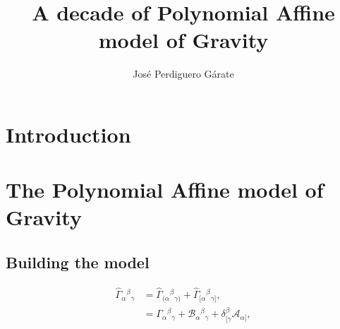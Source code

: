 \documentclass{article}
\title{A decade of Polynomial Affine model of Gravity}
\author{Jos\'e Perdiguero G\'arate}
\begin{document}
\maketitle
\tableofcontents

\section{Introduction}
\label{sec:introduction}


\section{The Polynomial Affine model of Gravity}
\label{sec:pag}


\subsection{Building the model}
\label{subsec:building the model}

\begin{equation}
\begin{aligned}
    \label{affine_connection}
    \hat{\Gamma}_{\alpha}{}^{\beta}{}_{\gamma} & = \hat{\Gamma}_{(\alpha}{}^{\beta}{}_{\gamma)} +  \hat{\Gamma}_{[\alpha}{}^{\beta}{}_{\gamma]},  \\
    & = \Gamma_{\alpha}{}^{\beta}{}_{\gamma} + \mathcal{B}_{\alpha}{}^{\beta}{}_{\gamma} + \delta^{\beta}_{[\gamma}\mathcal{A}_{\alpha]},
\end{aligned}
\end{equation}
\end{document}
